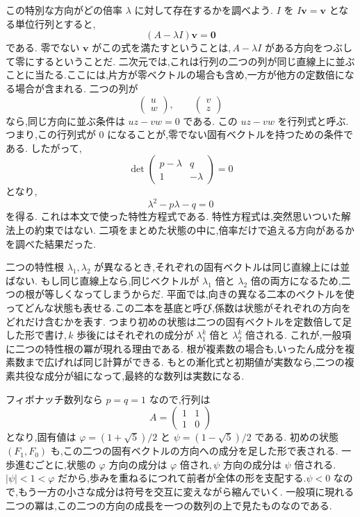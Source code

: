 この特別な方向がどの倍率 $\lambda$ に対して存在するかを調べよう.
$I$ を $I\boldsymbol v=\boldsymbol v$ となる単位行列とすると,
\[
  (A-\lambda I)\boldsymbol v=\boldsymbol 0
\]
である.
零でない $\boldsymbol v$ がこの式を満たすということは,\,$A-\lambda I$ がある方向をつぶして零にするということだ.
二次元では,これは行列の二つの列が同じ直線上に並ぶことに当たる.ここには,片方が零ベクトルの場合も含め,一方が他方の定数倍になる場合が含まれる.
二つの列が
\[
  \begin{pmatrix}u\\w\end{pmatrix},
  \qquad
  \begin{pmatrix}v\\z\end{pmatrix}
\]
なら,同じ方向に並ぶ条件は $uz-vw=0$ である.
この $uz-vw$ を行列式と呼ぶ.
つまり,この行列式が $0$ になることが,零でない固有ベクトルを持つための条件である.
したがって,
\[
  \det\begin{pmatrix}p-\lambda&q\\1&-\lambda\end{pmatrix}=0
\]
となり,
\[
  \lambda^2-p\lambda-q=0
\]
を得る.
これは本文で使った特性方程式である.
特性方程式は,突然思いついた解法上の約束ではない.
二項をまとめた状態の中に,倍率だけで追える方向があるかを調べた結果だった.

二つの特性根 $\lambda_1,\lambda_2$ が異なるとき,それぞれの固有ベクトルは同じ直線上には並ばない.
もし同じ直線上なら,同じベクトルが $\lambda_1$ 倍と $\lambda_2$ 倍の両方になるため,二つの根が等しくなってしまうからだ.
平面では,向きの異なる二本のベクトルを使ってどんな状態も表せる.この二本を基底と呼び,係数は状態がそれぞれの方向をどれだけ含むかを表す.
つまり初めの状態は二つの固有ベクトルを定数倍して足した形で書け,\,$k$ 歩後にはそれぞれの成分が $\lambda_1^k$ 倍と $\lambda_2^k$ 倍される.
これが,一般項に二つの特性根の冪が現れる理由である.
根が複素数の場合も,いったん成分を複素数まで広げれば同じ計算ができる.
もとの漸化式と初期値が実数なら,二つの複素共役な成分が組になって,最終的な数列は実数になる.

フィボナッチ数列なら $p=q=1$ なので,行列は
\[
  A=\begin{pmatrix}1&1\\1&0\end{pmatrix}
\]
となり,固有値は $\varphi=(1+\sqrt5)/2$ と $\psi=(1-\sqrt5)/2$ である.
初めの状態 $(F_1,F_0)$ も,この二つの固有ベクトルの方向への成分を足した形で表される.
一歩進むごとに,状態の $\varphi$ 方向の成分は $\varphi$ 倍され,\,$ \psi$ 方向の成分は $\psi$ 倍される.
$|\psi|<1<\varphi$ だから,歩みを重ねるにつれて前者が全体の形を支配する.$\psi<0$ なので,もう一方の小さな成分は符号を交互に変えながら縮んでいく.
一般項に現れる二つの冪は,この二つの方向の成長を一つの数列の上で見たものなのである.


